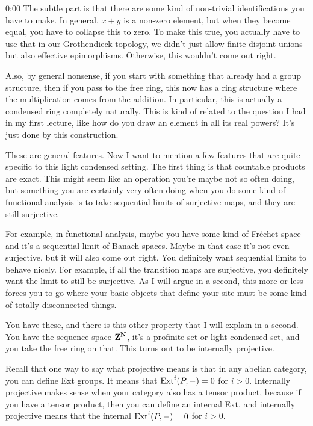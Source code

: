 \begin{unfinished}{0:00}
The subtle part is that there are some kind of non-trivial identifications you have to make. In general, $x+y$ is a non-zero element, but when they become equal, you have to collapse this to zero. To make this true, you actually have to use that in our Grothendieck topology, we didn't just allow finite disjoint unions but also effective epimorphisms. Otherwise, this wouldn't come out right.

Also, by general nonsense, if you start with something that already had a group structure, then if you pass to the free ring, this now has a ring structure where the multiplication comes from the addition. In particular, this is actually a condensed ring completely naturally. This is kind of related to the question I had in my first lecture, like how do you draw an element in all its real powers? It's just done by this construction.

These are general features. Now I want to mention a few features that are quite specific to this light condensed setting. The first thing is that countable products are exact. This might seem like an operation you're maybe not so often doing, but something you are certainly very often doing when you do some kind of functional analysis is to take sequential limits of surjective maps, and they are still surjective.

For example, in functional analysis, maybe you have some kind of Fréchet space and it's a sequential limit of Banach spaces. Maybe in that case it's not even surjective, but it will also come out right. You definitely want sequential limits to behave nicely. For example, if all the transition maps are surjective, you definitely want the limit to still be surjective. As I will argue in a second, this more or less forces you to go where your basic objects that define your site must be some kind of totally disconnected things.

You have these, and there is this other property that I will explain in a second. You have the sequence space $\mathbf Z^\mathbf N$, it's a profinite set or light condensed set, and you take the free ring on that. This turns out to be internally projective.

Recall that one way to say what projective means is that in any abelian category, you can define Ext groups. It means that $\operatorname{Ext}^i(P,-)=0$ for $i>0$. Internally projective makes sense when your category also has a tensor product, because if you have a tensor product, then you can define an internal Ext, and internally projective means that the internal $\operatorname{Ext}^i(P,-)=0$ for $i>0$.


\end{unfinished}
